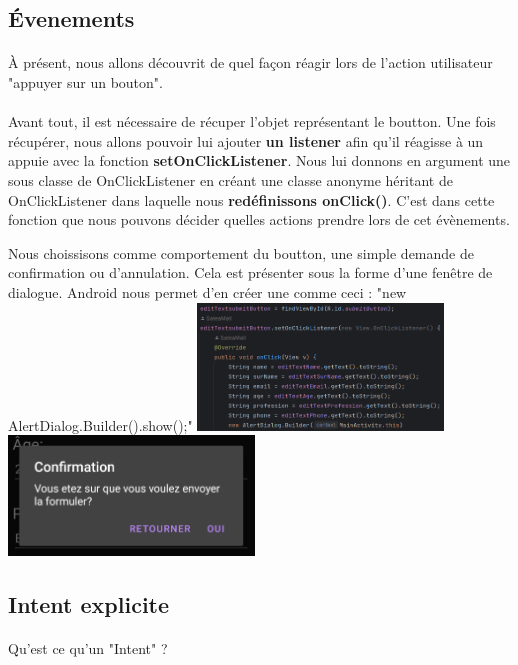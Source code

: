 \documentclass[a4paper]{article}
\begin{document}
\begin{multicols}{2}
  \subsection{Évenements}
    \paragraph{}
      À présent, nous allons découvrit de quel façon réagir lors de l'action utilisateur "appuyer sur un bouton".
    \paragraph{}
      Avant tout, il est nécessaire de récuper l'objet représentant le boutton. Une fois récupérer, nous allons pouvoir lui ajouter \textbf{un listener} afin qu'il réagisse à un appuie avec la fonction \textbf{setOnClickListener}. Nous lui donnons en argument une sous classe de OnClickListener en créant une classe anonyme héritant de OnClickListener dans laquelle nous \textbf{redéfinissons onClick()}. C'est dans cette fonction que nous pouvons décider quelles actions prendre lors de cet évènements.

      Nous choissisons comme comportement du boutton, une simple demande de confirmation ou d'annulation. Cela est présenter sous la forme d'une fenêtre de dialogue. Android nous permet d'en créer une comme ceci : "new AlertDialog.Builder().show();"
      \includegraphics[width=0.49\textwidth]{event/code}
      \includegraphics[width=0.49\textwidth]{event/dialogue}
  
  \subsection{Intent explicite}
    \paragraph{}
      Qu'est ce qu'un "Intent" ? 


\end{multicols}
\end{document}
